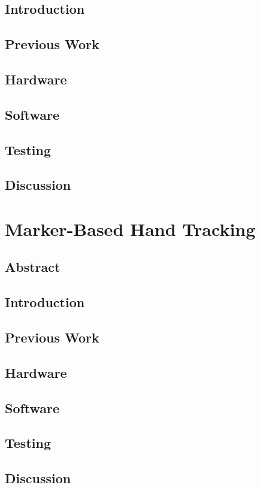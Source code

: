 \documentclass[12pt]{report}	%
\begin{document}
	\section{Introduction}
	\section{Previous Work}
	\section{Hardware}
	\section{Software}
	\section{Testing}
	\section{Discussion}

\chapter{Marker-Based Hand Tracking}
	\section{Abstract}
	\section{Introduction}
	\section{Previous Work}
	\section{Hardware}
	\section{Software}
	\section{Testing}
	\section{Discussion}
	
\end{document}
